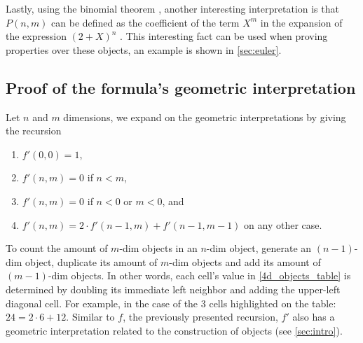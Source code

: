 \documentclass{article}
\begin{document}
	Lastly, using the binomial theorem \cite{rice2007}, another interesting interpretation is that $P(n,m)$ can be defined as the coefficient of the term $X^{m}$ in the expansion of the expression $(2 + X)^{n}$ \cite{coxeter1973regular}. This interesting fact can be used when proving properties over these objects, an example is shown in \autoref{sec:euler}.
	
	
	\subsection{Proof of the formula's geometric interpretation}
	
	Let $n$ and $m$ dimensions, we expand on the geometric interpretations by giving the recursion \cite{coxeter1973regular}
	\begin{enumerate}
		\item $f'(0,0) = 1$,
		
		\item $f'(n,m) = 0$ if $n < m$,
		
		\item $f'(n,m) = 0$ if $n < 0$ or $m < 0$, and
		
		\item $f'(n,m) = 2 \cdot f'(n-1, m) + f'(n-1, m-1)$ on any other case.
	\end{enumerate}
	
	To count the amount of $m$-dim objects in an $n$-dim object, generate an $(n-1)$-dim object, duplicate its amount of $m$-dim objects and add its amount of $(m-1)$-dim objects. In other words, each cell's value in \autoref{4d_objects_table} is determined by doubling its immediate left neighbor and adding the upper-left diagonal cell. For example, in the case of the $3$ cells highlighted on the table: $24 = 2 \cdot 6 + 12$. Similar to $f$, the previously presented recursion, $f'$ also has a geometric interpretation related to the construction of objects (see \autoref{sec:intro}).
	
\end{document}
